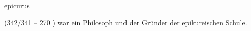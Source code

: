 \documentclass{stex}
\begin{document}
\begin{smodule}[sig=en]{epicurus}
\begin{sparagraph}[style=symdoc]
 (342/341 \vChr{} -- 270 \vChr{}) war ein
 Philosoph und der Gründer der
epikureischen Schule.
\end{sparagraph}
\end{smodule}
\end{document}
